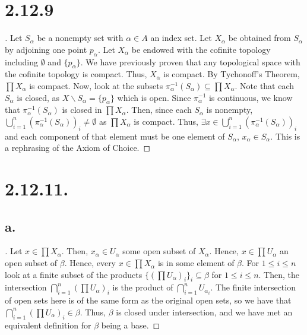 \documentclass{article}
\begin{document}
\section*{2.12.9}
\begin{proof}[\unskip\nopunct]
    Let $S_{\alpha}$ be a nonempty set with $\alpha \in A$ an index set. Let $X_{\alpha}$ be obtained from $S_{\alpha}$ by adjoining one point $p_{\alpha}$. Let $X_{\alpha}$ be endowed with the cofinite 
    topology including $\emptyset$ and $\{p_{\alpha}\}$. 
    We have previously proven that any topological space with the cofinite topology is compact.
    Thus, $X_{\alpha}$ is compact. By Tychonoff's Theorem, $\prod X_{\alpha}$ is compact. Now, look at the subsets $\pi_{\alpha}^{-1}(S_{\alpha}) \subseteq \prod X_{\alpha}$. Note that each $S_{\alpha}$ is closed, as $X \backslash S_{\alpha} = \{p_{\alpha}\}$ which is open. Since $\pi_{\alpha}^{-1}$ is continuous, we know that $\pi_{\alpha}^{-1} (S_{\alpha})$ is closed in $\prod X_{\alpha}$. Then, since each $S_{\alpha}$ is nonempty, $\bigcup\limits_{i = 1}^n \left(\pi_{\alpha}^{-1}(S_{\alpha})\right)_i \neq \emptyset$ as $\prod X_{\alpha}$ is compact. Thus, $\exists x \in \bigcup\limits_{i = 1}^n \left(\pi_{\alpha}^{-1}(S_{\alpha})\right)_i$
    and each component of that element must be one element of $S_{\alpha}$, $x_{\alpha} \in S_{\alpha}$. This is a rephrasing of the Axiom of Choice. 
\end{proof}

\section*{2.12.11.}
\subsection*{a.}
\begin{proof}[\unskip\nopunct]
    Let $x \in \prod X_{\alpha}$. Then, $x_{\alpha} \in U_{\alpha}$ some open subset of $X_{\alpha}$. Hence, $x \in \prod U_{\alpha}$ an open subset of $\beta$. Hence,
    every $x \in \prod X_{\alpha}$ is in some element of $\beta$. 
     For $1 \leq i \leq n$ look at a finite subset of the products $\{\left(\prod U_{\alpha} \right)_i\}_i \subseteq \beta$ for $1 \leq i \leq n$. Then, the intersection $\bigcap\limits_{i = 1}^n \left(\prod U_{\alpha} \right)_i$ is the product of $\bigcap\limits_{i = 1}^n U_{\alpha_{i}}$. The finite intersection of open sets here is of the same form as the original open sets, so we have that $\bigcap\limits_{i = 1}^n \left(\prod U_{\alpha} \right)_i \in \beta$. 
     Thus, $\beta$ is closed under intersection, and we have met an equivalent definition for $\beta$ being a base. 

\end{proof} 
\end{document}
